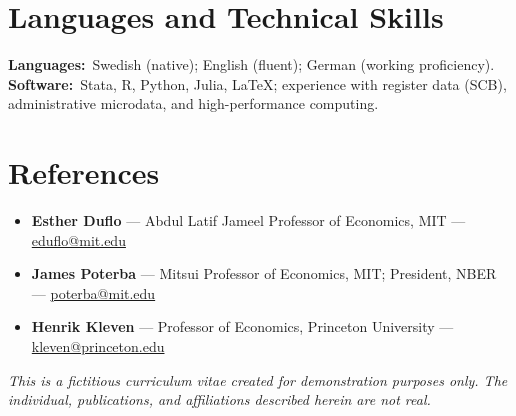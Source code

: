 \documentclass[11pt]{article}
\begin{document}
\section{Languages and Technical Skills}
\textbf{Languages:}\ Swedish (native); English (fluent); German (working proficiency).\\[4pt]
\textbf{Software:}\ Stata, R, Python, Julia, \LaTeX; experience with register data (SCB), administrative microdata, and high-performance computing.

\section{References}
\begin{itemize}
\item \textbf{Esther Duflo} --- Abdul Latif Jameel Professor of Economics, MIT --- \href{mailto:eduflo@mit.edu}{eduflo@mit.edu}
\item \textbf{James Poterba} --- Mitsui Professor of Economics, MIT; President, NBER --- \href{mailto:poterba@mit.edu}{poterba@mit.edu}
\item \textbf{Henrik Kleven} --- Professor of Economics, Princeton University --- \href{mailto:kleven@princeton.edu}{kleven@princeton.edu}
\end{itemize}

\vspace{10pt}
\begin{center}
\footnotesize\textcolor{mutedgray}{\emph{This is a fictitious curriculum vitae created for demonstration purposes only.
The individual, publications, and affiliations described herein are not real.}}
\end{center}
\end{document}
